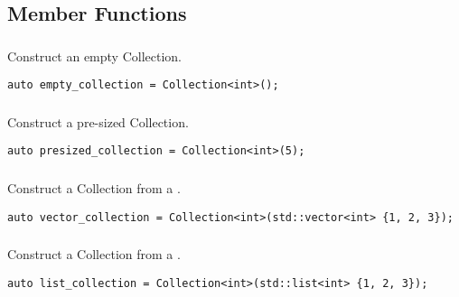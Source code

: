 

\subsection{Member Functions}


\subsubsection{}

Construct an empty Collection.

\begin{lstlisting}[title=example]
auto empty_collection = Collection<int>();
\end{lstlisting}




\subsubsection{}

Construct a pre-sized Collection.

\begin{lstlisting}[title=example]
auto presized_collection = Collection<int>(5);
\end{lstlisting}




\subsubsection{}

Construct a Collection from a .

\begin{lstlisting}[title=example]
auto vector_collection = Collection<int>(std::vector<int> {1, 2, 3});
\end{lstlisting}




\subsubsection{}

Construct a Collection from a .

\begin{lstlisting}[title=example]
auto list_collection = Collection<int>(std::list<int> {1, 2, 3});
\end{lstlisting}





